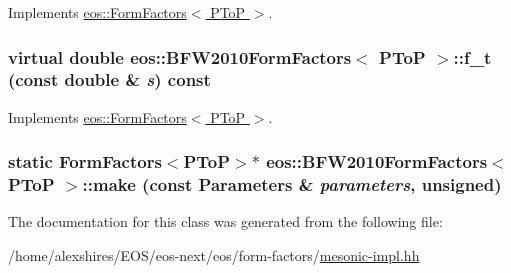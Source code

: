 Implements \hyperlink{classeos_1_1FormFactors_3_01PToP_01_4_a987757eb4559de496005ed2730e78a10}{eos::FormFactors$<$ PToP $>$}.\hypertarget{classeos_1_1BFW2010FormFactors_3_01PToP_01_4_a37ffe94ba17d4e2b68ec11b2960f97b7}{
\subsubsection[{f\_\-t}]{\setlength{\rightskip}{0pt plus 5cm}virtual double eos::BFW2010FormFactors$<$ {\bf PToP} $>$::f\_\-t (const double \& {\em s}) const}}
\label{classeos_1_1BFW2010FormFactors_3_01PToP_01_4_a37ffe94ba17d4e2b68ec11b2960f97b7}


Implements \hyperlink{classeos_1_1FormFactors_3_01PToP_01_4_ae753d67d42936bd32b043838e7fb769a}{eos::FormFactors$<$ PToP $>$}.\hypertarget{classeos_1_1BFW2010FormFactors_3_01PToP_01_4_ac0b060522c5009c4934beaeb113a3f22}{
\subsubsection[{make}]{\setlength{\rightskip}{0pt plus 5cm}static FormFactors$<${\bf PToP}$>$$\ast$ eos::BFW2010FormFactors$<$ {\bf PToP} $>$::make (const {\bf Parameters} \& {\em parameters}, \/  unsigned)}}
\label{classeos_1_1BFW2010FormFactors_3_01PToP_01_4_ac0b060522c5009c4934beaeb113a3f22}


The documentation for this class was generated from the following file:\begin{DoxyCompactItemize}
\item 
/home/alexshires/EOS/eos-\/next/eos/form-\/factors/\hyperlink{mesonic-impl_8hh}{mesonic-\/impl.hh}\end{DoxyCompactItemize}
